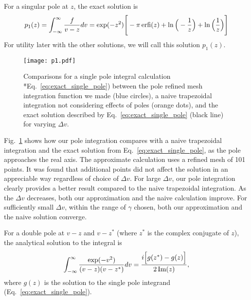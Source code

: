 For a singular pole at $z$, the exact solution is
\begin{equation}
	p_1(z) = \int_{-\infty}^\infty \frac{f}{v-z} dv = 
	\exp(-z^2) \Bigg[ -\pi \operatorname{erfi}(z) + \ln \Big(-\frac{1}{z}\Big) + \ln\Big(\frac{1}{z}\Big)\Bigg]\\
	\label{eq:exact_single_pole}
\end{equation}
For utility later with the other solutions, we will call this solution $p_1(z)$.

\begin{figure}[!htb]
	\centering
	\texttt{[image: p1.pdf]}
	\caption{Comparisons for a single pole integral calculation *Eq.~\ref{eq:exact_single_pole})
		between the pole refined mesh integration function we made (blue circles), %
		a naive trapezoidal integration not considering effects of poles (orange dots), and
		the exact solution described by Eq.~\ref{eq:exact_single_pole} (black line)
		for varying $\Delta v$.}
	\label{f:single_pole_comparison}
\end{figure}

Fig.~\ref{f:single_pole_comparison} shows how our pole integration compares with 
a naive trapezoidal integration and the exact solution from Eq.~\ref{eq:exact_single_pole},
as the pole approaches the real axis.
The approximate calculation uses a refined mesh of 101 points. 
It was found that additional points did not affect the solution in an appreciable way regardless of choice of $\Delta v$.
For large $\Delta v$, our pole integration clearly provides a better result
compared to the naive trapezoidal integration. 
As the $\Delta v$ decreases, both our approximation and the naive calculation improve.
For sufficiently small $\Delta v$, within the range of $\gamma$ chosen, both our
approximation and the naive solution converge.


For a double pole at $v - z$ and $v-z^*$ (where $z^*$ is the complex conjugate of $z$), the analytical solution to the integral is
\begin{equation}
	\int_{-\infty}^\infty \frac{\exp (-v^2)}{(v-z)(v-z^*)} dv = 
	\frac{i \Big[ g(z^*) - g(z)  \Big]}{2 \operatorname{Im}(z)},
	\label{eq:exact_double_pole}
\end{equation}
where $g(z)$ is the solution to the single pole integrand (Eq.~\ref{eq:exact_single_pole}).


